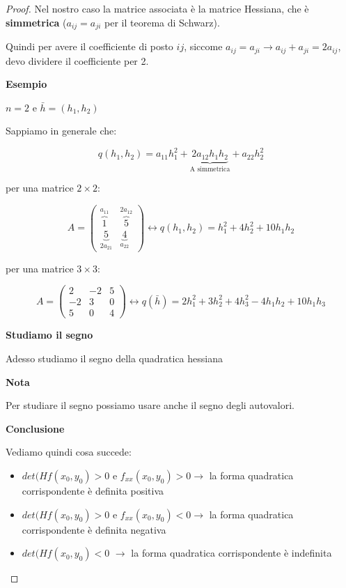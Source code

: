 \documentclass[../appunti-analisi.tex]{subfiles}
\begin{document}
\begin{proof}
       Nel nostro caso la matrice associata è la matrice Hessiana, che è \textbf{simmetrica} ($a_{ij} = a_{ji}$ per il teorema di Schwarz).

       Quindi per avere il coefficiente di posto $ij$, siccome $a_{ij} = a_{ji} \rightarrow a_{ij} + a_{ji} = 2a_{ij}$, devo dividere il coefficiente per 2.


\textbf{Esempio} 

$n=2$ e $\bar{h} =(h_1,h_2)$

Sappiamo in generale che:

\[
    q(h_1,h_2) = a_{11} h_1^{2} + \underbrace{2a_{12} h_1 h_2}_\text{A simmetrica} + a_{22}h_2^{2}
\]

per una matrice $2\times 2$:

\[
    A= \begin{pmatrix}
        \overbrace{1}^\text{$a_{11}$} & \overbrace{5}^\text{$2a_{12}$}\\
        \underbrace{5}_\text{$2a_{21}$} & \underbrace{4}_\text{$a_{22}$}
    \end{pmatrix} \leftrightarrow 
    q(h_1,h_2) = h_1^{2}+4 h_2^{2}+ 10 h_1 h_2
\]

per una matrice $3\times 3$:

\[
    A = \begin{pmatrix}
    2 & -2 & 5\\
    -2 & 3 & 0\\
    5 & 0 & 4
    \end{pmatrix} \leftrightarrow
    q(\bar{h} ) = 2 h_1^{2}+3 h_2^{2}+ 4 h_3^{2} - 4 h_1 h_2 + 10 h_1 h_3
\]

\newpage

\textbf{Studiamo il segno} 

Adesso studiamo il segno della quadratica hessiana




\textbf{Nota} 

Per studiare il segno possiamo usare anche il segno degli autovalori.

\textbf{Conclusione} 

Vediamo quindi cosa succede:

\begin{itemize}
    \item $det(Hf(x_0,y_0)>0$ e $f_{xx}(x_0,y_0)>0 \rightarrow $ la forma quadratica corrispondente è definita positiva
    \item $det(Hf(x_0,y_0)>0$ e $f_{xx}(x_0,y_0)<0 \rightarrow $ la forma quadratica corrispondente è definita negativa
    \item $det(Hf(x_0,y_0)<0$ $\rightarrow $ la forma quadratica corrispondente è indefinita
\end{itemize}

\end{proof}
 
\end{document}

